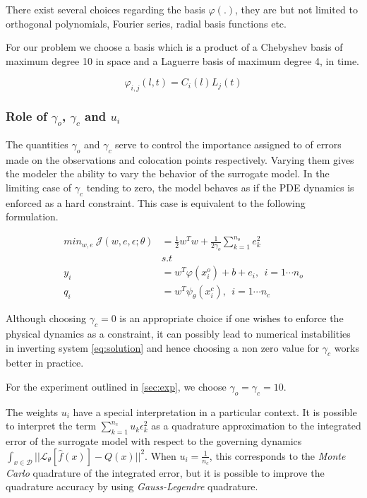 There exist several choices regarding the basis $\varphi(.)$, they are but not limited to 
orthogonal polynomials, Fourier series, radial basis functions etc. 

For our problem we choose a basis which is a product of a Chebyshev basis of maximum degree 10 in space and a Laguerre basis of maximum degree 4, in time.

\begin{equation}\label{eq:basis}
\varphi_{i,j}(l,t) = C_{i}(l) L_{j}(t)
\end{equation}



\subsubsection*{Role of $\gamma_o$, $\gamma_c$ and $u_i$}

The quantities $\gamma_o$ and $\gamma_c$ serve to control the importance assigned to
of errors made on the observations and colocation points respectively. Varying them 
gives the modeler the ability to vary the behavior of the surrogate model. In the 
limiting case of $\gamma_c$ tending to zero, the model behaves as if the PDE dynamics
is enforced as a hard constraint. This case is equivalent to the following formulation.

\begin{align}\label{eq:surrogate2}
   min_{w,e} \ \mathcal{J}(w,e,\epsilon;\theta) &= 
   \frac{1}{2} w^{T}w + \frac{1}{2\gamma_{o}} \sum_{k = 1}^{n_{o}}{e^{2}_{k}} \\
  & s.t \nonumber \\
  y_{i} & = w^{T}\varphi(x^{o}_{i}) + b + e_{i}, \ \ i = 1 \cdots n_{o} \\
  q_{i} & = w^{T}\psi_{\theta}(x^{c}_{i}), \ \ i = 1 \cdots n_{c}
\end{align}

Although choosing $\gamma_c = 0$ is an appropriate choice if one wishes
to enforce the physical dynamics as a constraint, it can possibly lead to numerical
instabilities in inverting system \ref{eq:solution} and hence choosing a non zero value 
for $\gamma_c$ works better in practice.

For the experiment outlined in \ref{sec:exp}, we choose $\gamma_o = \gamma_c = 10$.

The weights $u_i$ have a special interpretation in a particular context. It is possible to
interpret the term $\sum_{k = 1}^{n_{c}}{u_{k} \epsilon^{2}_{k}}$ as a quadrature approximation
to the integrated error of the surrogate model with respect to the governing dynamics $\int_{x \in \mathcal{D}}{||\mathcal{L}_{\theta} [\hat{f}(x)] - Q(x)||^2}$. When
$u_i = \frac{1}{n_c}$, this corresponds to the \emph{Monte Carlo} quadrature of 
the integrated error, but it is possible to improve the quadrature accuracy by using \emph{Gauss-Legendre} quadrature.

